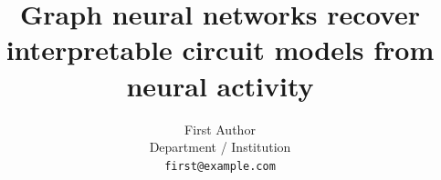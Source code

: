 \documentclass{article}
\title{Graph neural networks recover interpretable \comment{quantitative} circuit models from neural activity}
\author{%
  First Author \\
  Department / Institution \\
  \texttt{first@example.com} \\
}
\begin{document}
\maketitle


\begin{abstract}






\end{abstract}
\end{document}
